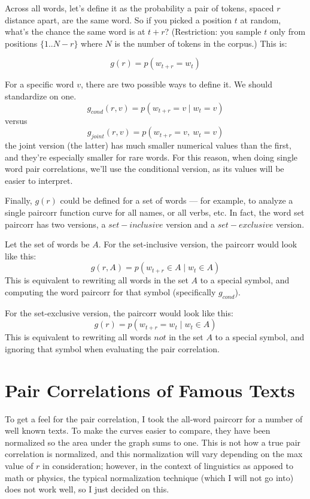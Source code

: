 \documentclass[11pt,letterpaper]{article}
\theoremstyle{definition}
\begin{document}
Across all words, let's define it as the probability a pair of tokens, spaced $r$ distance apart, are the same word.  So if you picked a position $t$ at random, what's the chance the same word is at $t+r$?  (Restriction: you sample $t$ only from positions $\{1..N-r\}$ where $N$ is the number of tokens in the corpus.)  This is:

\[ g(r) = p(w_{t+r} = w_{t}) \]

For a specific word $v$, there are two possible ways to define it.  We should standardize on one.
\[ g_{cond}(r,v) = p(w_{t+r} = v \mid  w_t = v) \]
versus
\[ g_{joint}(r,v) = p(w_{t+r} = v,\ w_t = v) \]
the joint version (the latter) has much smaller numerical values than the first, and they're especially smaller for rare words. For this reason, when doing single word pair correlations, we'll use the conditional version, as its values will be easier to interpret.

Finally, $g(r)$ could be defined for a set of words --- for example, to analyze a single paircorr function curve for all names, or all verbs, etc. In fact, the word set paircorr has two versions, a $set-inclusive$ version and a $set-exclusive$ version.

Let the set of words be $A$. 
For the set-inclusive version, the paircorr would look like this:
\[ g(r,A) = p(w_{t+r} \in A \mid w_t \in A) \]
This is equivalent to rewriting all words in the set $A$ to a special symbol, and computing the word paircorr for that symbol (specifically $g_{cond}$).

For the set-exclusive version, the paircorr would look like this:
\[ g(r) = p(w_{t+r} = w_{t} \mid w_t \in A)  \]
This is equivalent to rewriting all words $not$ in the set $A$ to a special symbol, and ignoring that symbol when evaluating the pair correlation.


\section{Pair Correlations of Famous Texts}

To get a feel for the pair correlation, I took the all-word paircorr for a number of well known texts. To make the curves easier to compare, they have been normalized so the area under the graph sums to one. This is not how a true pair correlation is normalized, and this normalization will vary depending on the max value of $r$ in consideration; however, in the context of linguistics as apposed to math or physics, the typical normalization technique (which I will not go into) does not work well, so I just decided on this.
\end{document}
